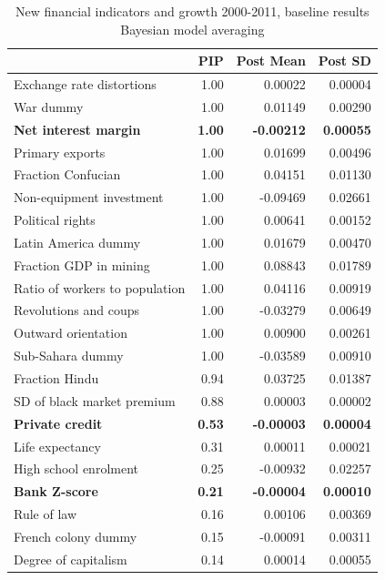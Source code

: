 \begin{table}[!htbp]
	\centering
	\caption{New financial indicators and growth 2000-2011, baseline results\\
		Bayesian model averaging}
		\label{ch2tab:BMAgrowth2000-2011}
	\small
	\begin{tabular}{lrrr}
		\toprule
		& PIP & Post Mean & Post SD \\ 
		\midrule
		  Exchange rate distortions & 1.00 & 0.00022 & 0.00004 \\ 
		  War dummy & 1.00 & 0.01149 & 0.00290 \\ 
		  \textbf{Net interest margin} & \textbf{1.00} & \textbf{-0.00212} & \textbf{0.00055} \\ 
		  Primary exports & 1.00 & 0.01699 & 0.00496 \\ 
		  Fraction Confucian & 1.00 & 0.04151 & 0.01130 \\ 
		  Non-equipment investment & 1.00 & -0.09469 & 0.02661 \\ 
		  Political rights & 1.00 & 0.00641 & 0.00152 \\ 
		  Latin America dummy & 1.00 & 0.01679 & 0.00470 \\ 
		  Fraction GDP in mining & 1.00 & 0.08843 & 0.01789 \\ 
		  Ratio of workers to population & 1.00 & 0.04116 & 0.00919 \\ 
		  Revolutions and coups & 1.00 & -0.03279 & 0.00649 \\ 
		  Outward orientation & 1.00 & 0.00900 & 0.00261 \\ 
		  Sub-Sahara dummy & 1.00 & -0.03589 & 0.00910 \\ 
		  Fraction Hindu & 0.94 & 0.03725 & 0.01387 \\ 
		  SD of black market premium & 0.88 & 0.00003 & 0.00002 \\ 
		  \textbf{Private credit} & \textbf{0.53} & \textbf{-0.00003} & \textbf{0.00004} \\ 
		  Life expectancy & 0.31 & 0.00011 & 0.00021 \\ 
		  High school enrolment & 0.25 & -0.00932 & 0.02257 \\ 
		  \textbf{Bank Z-score} & \textbf{0.21} & \textbf{-0.00004} & \textbf{0.00010} \\ 
		  Rule of law & 0.16 & 0.00106 & 0.00369 \\ 
		  French colony dummy & 0.15 & -0.00091 & 0.00311 \\ 
		  Degree of capitalism & 0.14 & 0.00014 & 0.00055 \\ 

\end{tabular}
\end{table}
